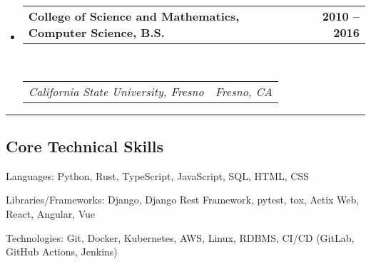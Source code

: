 \documentclass[10pt,letterpaper]{article}
\makeatletter
\newenvironment{indentsection}[1]%
{\begin{list}{}%
    {\setlength{\leftmargin}{#1}}%
    \item[]%
}
{\end{list}}
\newcommand{\headerrow}[2]
{\begin{tabular*}{\linewidth}{l@{\extracolsep{\fill}}r}
#1 &
#2 \\
\end{tabular*}}
\makeatother
\begin{document}
\begin{itemize}
    \parskip=0.1em

    \item
          \headerrow
          {\textbf{College of Science and Mathematics, Computer Science, B.S.}}
          {\textbf{2010 -- 2016}}
          \\
          \headerrow
          {\emph{California State University, Fresno}}
          {\emph{Fresno, CA}}

\end{itemize}


\hrule
\vspace{-0.4em}
\subsection*{Core Technical Skills}

\begin{indentsection}{\parindent}
    \begin{description*}
        \item[Languages:]
            Python, Rust, TypeScript, JavaScript, SQL, HTML, CSS
        \item[Libraries/Frameworks:]
            Django, Django Rest Framework, pytest, tox, Actix Web, React, Angular, Vue
        \item[Technologies:]
            Git, Docker, Kubernetes, AWS, Linux, RDBMS, CI/CD (GitLab, GitHub Actions, Jenkins)
    \end{description*}
\end{indentsection}
\end{document}
